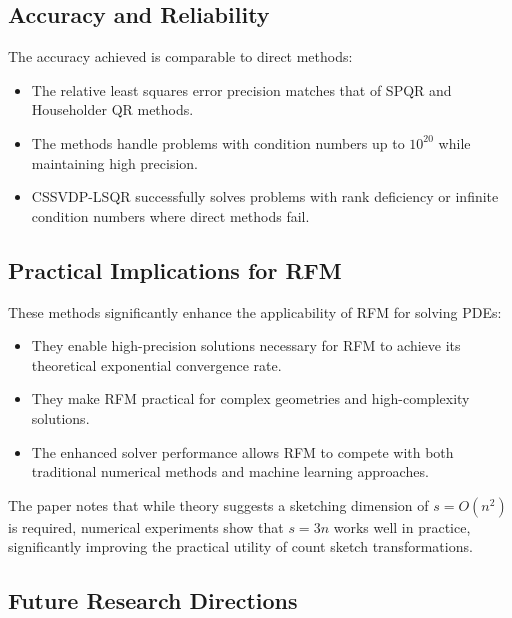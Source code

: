 \documentclass[11pt]{article}
\begin{document}
\subsection{Accuracy and Reliability}

The accuracy achieved is comparable to direct methods:

\begin{itemize}
    \item The relative least squares error precision matches that of SPQR and Householder QR methods.
    
    \item The methods handle problems with condition numbers up to $10^{20}$ while maintaining high precision.
    
    \item CSSVDP-LSQR successfully solves problems with rank deficiency or infinite condition numbers where direct methods fail.
\end{itemize}

\subsection{Practical Implications for RFM}

These methods significantly enhance the applicability of RFM for solving PDEs:

\begin{itemize}
    \item They enable high-precision solutions necessary for RFM to achieve its theoretical exponential convergence rate.
    
    \item They make RFM practical for complex geometries and high-complexity solutions.
    
    \item The enhanced solver performance allows RFM to compete with both traditional numerical methods and machine learning approaches.
\end{itemize}

The paper notes that while theory suggests a sketching dimension of $s = O(n^2)$ is required, numerical experiments show that $s = 3n$ works well in practice, significantly improving the practical utility of count sketch transformations.

\subsection{Future Research Directions}
\end{document}
